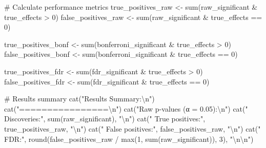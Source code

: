 \documentclass[
  11pt,
  letterpaper,
  oneside]{book}
\newenvironment{Shaded}{\begin{snugshade}}{\end{snugshade}}
\newcommand{\CommentTok}[1]{\textcolor[rgb]{0.37,0.37,0.37}{#1}}
\newcommand{\DecValTok}[1]{\textcolor[rgb]{0.68,0.00,0.00}{#1}}
\newcommand{\FunctionTok}[1]{\textcolor[rgb]{0.28,0.35,0.67}{#1}}
\newcommand{\NormalTok}[1]{\textcolor[rgb]{0.00,0.23,0.31}{#1}}
\newcommand{\OtherTok}[1]{\textcolor[rgb]{0.00,0.23,0.31}{#1}}
\newcommand{\SpecialCharTok}[1]{\textcolor[rgb]{0.37,0.37,0.37}{#1}}
\newcommand{\StringTok}[1]{\textcolor[rgb]{0.13,0.47,0.30}{#1}}
\begin{document}
\begin{Shaded}
\begin{Highlighting}[]
\CommentTok{\# Calculate performance metrics}
\NormalTok{true\_positives\_raw }\OtherTok{\textless{}{-}} \FunctionTok{sum}\NormalTok{(raw\_significant }\SpecialCharTok{\&}\NormalTok{ true\_effects }\SpecialCharTok{\textgreater{}} \DecValTok{0}\NormalTok{)}
\NormalTok{false\_positives\_raw }\OtherTok{\textless{}{-}} \FunctionTok{sum}\NormalTok{(raw\_significant }\SpecialCharTok{\&}\NormalTok{ true\_effects }\SpecialCharTok{==} \DecValTok{0}\NormalTok{)}

\NormalTok{true\_positives\_bonf }\OtherTok{\textless{}{-}} \FunctionTok{sum}\NormalTok{(bonferroni\_significant }\SpecialCharTok{\&}\NormalTok{ true\_effects }\SpecialCharTok{\textgreater{}} \DecValTok{0}\NormalTok{)}
\NormalTok{false\_positives\_bonf }\OtherTok{\textless{}{-}} \FunctionTok{sum}\NormalTok{(bonferroni\_significant }\SpecialCharTok{\&}\NormalTok{ true\_effects }\SpecialCharTok{==} \DecValTok{0}\NormalTok{)}

\NormalTok{true\_positives\_fdr }\OtherTok{\textless{}{-}} \FunctionTok{sum}\NormalTok{(fdr\_significant }\SpecialCharTok{\&}\NormalTok{ true\_effects }\SpecialCharTok{\textgreater{}} \DecValTok{0}\NormalTok{)}
\NormalTok{false\_positives\_fdr }\OtherTok{\textless{}{-}} \FunctionTok{sum}\NormalTok{(fdr\_significant }\SpecialCharTok{\&}\NormalTok{ true\_effects }\SpecialCharTok{==} \DecValTok{0}\NormalTok{)}

\CommentTok{\# Results summary}
\FunctionTok{cat}\NormalTok{(}\StringTok{"Results Summary:}\SpecialCharTok{\textbackslash{}n}\StringTok{"}\NormalTok{)}
\FunctionTok{cat}\NormalTok{(}\StringTok{"================}\SpecialCharTok{\textbackslash{}n}\StringTok{"}\NormalTok{)}
\FunctionTok{cat}\NormalTok{(}\StringTok{"Raw p{-}values (α = 0.05):}\SpecialCharTok{\textbackslash{}n}\StringTok{"}\NormalTok{)}
\FunctionTok{cat}\NormalTok{(}\StringTok{"  Discoveries:"}\NormalTok{, }\FunctionTok{sum}\NormalTok{(raw\_significant), }\StringTok{"}\SpecialCharTok{\textbackslash{}n}\StringTok{"}\NormalTok{)}
\FunctionTok{cat}\NormalTok{(}\StringTok{"  True positives:"}\NormalTok{, true\_positives\_raw, }\StringTok{"}\SpecialCharTok{\textbackslash{}n}\StringTok{"}\NormalTok{)}
\FunctionTok{cat}\NormalTok{(}\StringTok{"  False positives:"}\NormalTok{, false\_positives\_raw, }\StringTok{"}\SpecialCharTok{\textbackslash{}n}\StringTok{"}\NormalTok{)}
\FunctionTok{cat}\NormalTok{(}\StringTok{"  FDR:"}\NormalTok{, }\FunctionTok{round}\NormalTok{(false\_positives\_raw }\SpecialCharTok{/} \FunctionTok{max}\NormalTok{(}\DecValTok{1}\NormalTok{, }\FunctionTok{sum}\NormalTok{(raw\_significant)), }\DecValTok{3}\NormalTok{), }\StringTok{"}\SpecialCharTok{\textbackslash{}n\textbackslash{}n}\StringTok{"}\NormalTok{)}


\end{Highlighting}
\end{Shaded}
\end{document}
